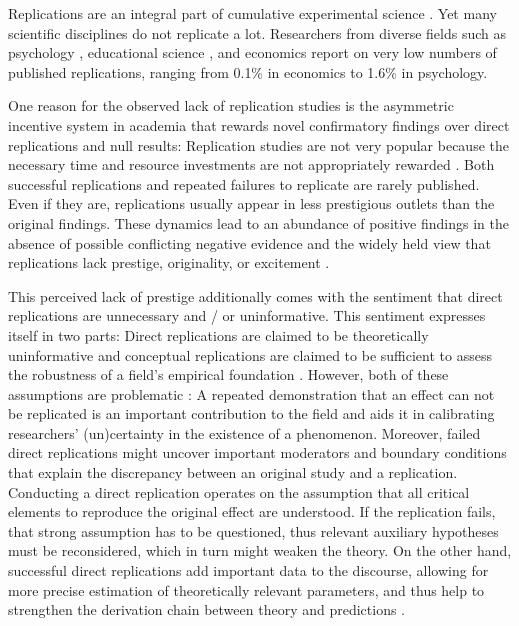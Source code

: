 \documentclass[cm,linguex]{glossa}
\begin{document}
Replications are an integral part of cumulative experimental science \citep[e.g.,][]{campbell_reforms_1969, rosenthal_replication_1990, zwaan_making_2018}. Yet many scientific disciplines do not replicate a lot. Researchers from diverse fields such as psychology \citep{makel_replications_2012}, educational science \citep{makel_facts_2014}, and economics \citep{mueller2019replication} report on very low numbers of published replications, ranging from 0.1\% in economics to 1.6\% in psychology.

One reason for the observed lack of replication studies is the asymmetric incentive system in academia that rewards novel confirmatory findings over direct replications and null results: Replication studies are not very popular because the necessary time and resource investments are not appropriately rewarded \citep[e.g.,][]{koole_rewarding_2012, nosek_scientific_2012}. Both successful replications \citep{madden_how_1995} and repeated failures to replicate \citep[e.g.,][]{doyen_behavioral_2012} are rarely published. Even if they are, replications usually appear in less prestigious outlets than the original findings. These dynamics lead to an abundance of positive findings in the absence of possible conflicting negative evidence \citep[see also][]{fanelli_pressures_2010} and the widely held view that replications lack prestige, originality, or excitement \citep[e.g.,][]{lindsay1993design}.

This perceived lack of prestige additionally comes with the sentiment that direct replications are unnecessary and / or uninformative.
This sentiment expresses itself in two parts: Direct replications are claimed to be theoretically uninformative and conceptual replications are claimed to be sufficient to assess the robustness of a field's empirical foundation \citep[e.g.,][]{stroebe2014alleged, crandall2016scientific}.
However, both of these assumptions are problematic \citep[e.g.,][]{zwaan_making_2018}:
A repeated demonstration that an effect can not be replicated is an important contribution to the field and aids it in calibrating researchers' (un)certainty in the existence of a phenomenon.
Moreover, failed direct replications might uncover important moderators and boundary conditions that explain the discrepancy between an original study and a replication.
Conducting a direct replication operates on the assumption that all critical elements to reproduce the original effect are understood.
If the replication fails, that strong assumption has to be questioned, thus relevant auxiliary hypotheses must be reconsidered, which in turn might weaken the theory.
On the other hand, successful direct replications add important data to the discourse, allowing for more precise estimation of theoretically relevant parameters, and thus help to strengthen the derivation chain between theory and predictions \citep{meehl1990summaries}.
\end{document}
